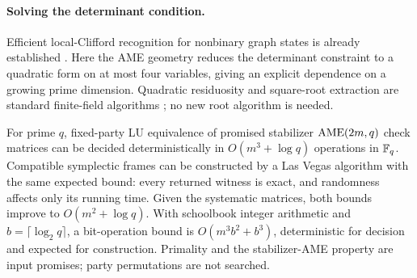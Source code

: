 \paragraph{Solving the determinant condition.}
Efficient local-Clifford recognition for nonbinary graph states is already
established \cite[Section~IV]{BahramgiriBeigi2007Graph}
\cite[Section~6]{BahramgiriBeigi2007Algorithm}.  Here the AME geometry reduces
the determinant constraint to a quadratic form on at most four variables,
giving an explicit dependence on a growing prime dimension.  Quadratic
residuosity and square-root extraction are standard finite-field algorithms
\cite[Section~12.4.1]{Shoup2008}
\cite[Section~2.2]{AdiguzelGoktasOzdemir2024}; no new root algorithm is needed.

\begin{corollary}
\label{cor:fast-prime-recognition}
For prime \(q\), fixed-party LU equivalence of promised stabilizer
\(\mathrm{AME}(2m,q)\) check matrices can be decided deterministically in
\(O(m^3+\log q)\) operations in \(\mathbb F_q\).  Compatible symplectic frames
can be constructed by a Las Vegas algorithm with the same expected bound:
every returned witness is exact, and randomness affects only its running time.
Given the systematic matrices, both bounds improve to
\(O(m^2+\log q)\).
With schoolbook integer arithmetic and \(b=\lceil\log_2 q\rceil\), a
bit-operation bound is \(O(m^3b^2+b^3)\), deterministic for decision and
expected for construction.  Primality and the stabilizer-AME property are
input promises; party permutations are not searched.
\end{corollary}

